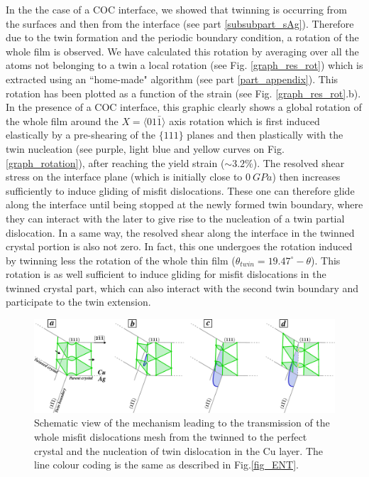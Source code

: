 \documentclass[final,3p,times,twocolumn]{elsarticle}
\begin{document}
In the the case of a COC interface, we showed that twinning is occurring from the surfaces and then from the interface (see part \ref{subsubpart_sAg}). Therefore due to the twin formation and the periodic boundary condition, a rotation of the whole film is observed. We have calculated this rotation by averaging over all the atoms not belonging to a twin a local rotation (see Fig. \ref{graph_res_rot}) which is extracted using an ``home-made" algorithm (see part \ref{part_appendix}). This rotation has been plotted as a function of the strain (see Fig. \ref{graph_res_rot}.b). In the presence of a COC interface, this graphic clearly shows a global rotation of the whole film around the $X=\langle01\bar{1}\rangle$ axis rotation which is first induced elastically by a pre-shearing of the $\lbrace111\rbrace$ planes and then plastically with the twin nucleation (see purple, light blue and yellow curves on Fig. \ref{graph_rotation}), after reaching the yield strain ($ \sim 3.2\% $). The resolved shear stress on the interface plane (which is initially close to $0~GPa$) then increases sufficiently to induce gliding of misfit dislocations. These one can therefore glide along the interface until being stopped at the newly formed twin boundary, where they can interact with the later to give rise to the nucleation of a twin partial dislocation. In a same way, the resolved shear along the interface in the twinned crystal portion is also not zero. In fact, this one undergoes the rotation induced by twinning less the rotation of the whole thin film ($\theta_{twin}=19.47^{\circ}-\theta$). This rotation is as well sufficient to induce gliding for misfit dislocations in the twinned crystal part, which can also interact with the second twin boundary and participate to the twin extension. 

\begin{figure}[!t]
	\begin{center}
		\includegraphics[width=150mm]{Pic/fig_SOR.eps} 
	\end{center}\caption{Schematic view of the mechanism leading to the transmission of the whole misfit dislocations mesh from the twinned to the perfect crystal and the nucleation of twin dislocation in the Cu layer. The line colour coding is the same as described in Fig.\ref{fig_ENT}.}\label{fig_SOR}
\end{figure}
\end{document}
